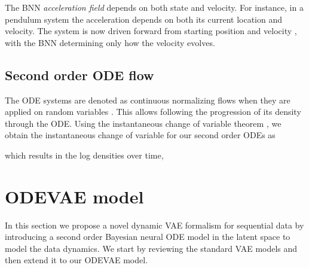 \documentclass{article}
\newcommand{\0}{\mathbf{0}}
\begin{document}
The BNN \emph{acceleration field}  depends on both state and velocity. For instance, in a pendulum system the acceleration  depends on both its current location and velocity. The system is now driven forward from starting position  and velocity , with the BNN determining only how the velocity  evolves. 



\subsection{Second order ODE flow}

The ODE systems are denoted as continuous normalizing flows when they are applied on random variables  \citep{rezende2014,chen2018ctf,grathwohl2018ffjord}. This allows following the progression of its density through the ODE. Using the instantaneous change of variable theorem \citep{chen2018ctf}, we obtain the instantaneous change of variable for our second order ODEs as

which results in the log densities over time,





































\section{ODEVAE model}

In this section we propose a novel dynamic VAE formalism for sequential data by introducing a second order Bayesian neural ODE model in the latent space to model the data dynamics. We start by reviewing the standard VAE models and then extend it to our ODEVAE model.
\end{document}
